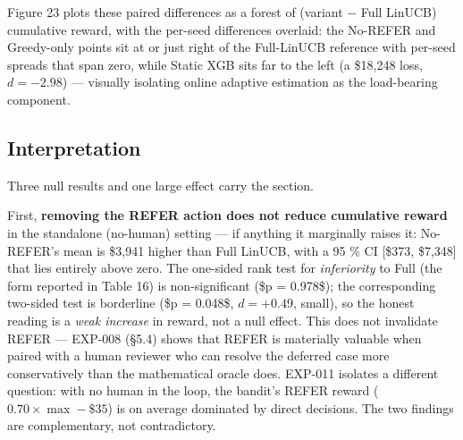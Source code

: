 Figure 23 plots these paired differences as a forest of (variant \(-\) Full LinUCB) cumulative reward, with the per-seed differences overlaid: the No-REFER and Greedy-only points sit at or just right of the Full-LinUCB reference with per-seed spreads that span zero, while Static XGB sits far to the left (a \$18,248 loss, \(d = -2.98\)) --- visually isolating online adaptive estimation as the load-bearing component.


\subsection{Interpretation}\label{interpretation-1}

Three null results and one large effect carry the section.

First, \textbf{removing the REFER action does not reduce cumulative reward} in the standalone (no-human) setting --- if anything it marginally raises it: No-REFER's mean is \$3,941 higher than Full LinUCB, with a 95 \% CI {[}\$373, \$7,348{]} that lies entirely above zero. The one-sided rank test for \emph{inferiority} to Full (the form reported in Table 16) is non-significant (\$p = 0.978\$); the corresponding two-sided test is borderline (\$p = 0.048\$, \(d = +0.49\), small), so the honest reading is a \emph{weak increase} in reward, not a null effect. This does not invalidate REFER --- EXP-008 (§5.4) shows that REFER is materially valuable when paired with a human reviewer who can resolve the deferred case more conservatively than the mathematical oracle does. EXP-011 isolates a different question: with no human in the loop, the bandit's REFER reward (\(0.70 \times \max - \$35\)) is on average dominated by direct decisions. The two findings are complementary, not contradictory.

